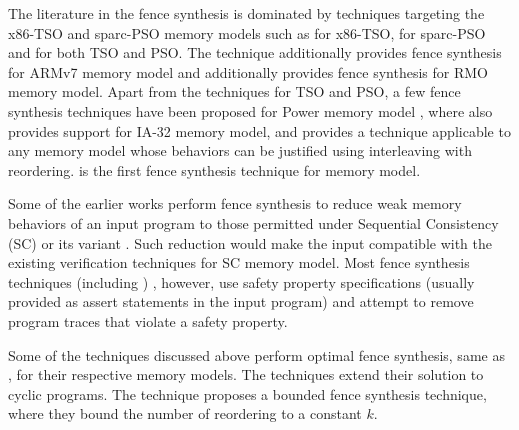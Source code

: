The literature in the  fence synthesis is dominated by 
techniques targeting the x86-TSO and sparc-PSO memory models
such as \cite{abdulla2012counter,alglave2010fences,alglave2014don,linden2011verification,abdulla2012automatic,abdulla2015best,bender2015declarative} 
for x86-TSO,
\cite{abdulla2015precise,linden2013verification} 
for sparc-PSO and \cite{liu2012dynamic,meshman2014synthesis,abdulla2013memorax,joshi2015property,kuperstein2012automatic}
for both TSO and PSO.
%
The technique \cite{bender2015declarative} additionally
provides fence synthesis for ARMv7 memory model and 
\cite{kuperstein2012automatic} additionally provides
fence synthesis for RMO memory model.
%
Apart from the techniques for TSO and PSO, a few 
fence synthesis techniques have been proposed for Power
memory model 
\cite{alglave2010fences,abdulla2015precise,fang2003automatic}, 
where \cite{fang2003automatic} also 
provides support for IA-32 memory model, and
\cite{joshi2015property} provides a technique applicable to
any memory model whose behaviors can be justified using
interleaving with reordering.
%
\ourtechnique is the first fence synthesis technique for 
\cc memory model.

Some of the earlier works  
\cite{alglave2010fences,abdulla2015precise,fang2003automatic} 
perform fence synthesis to reduce weak memory behaviors of an 
input program to those permitted under Sequential Consistency (SC)
or its variant \cite{abdulla2015best}. Such reduction would
make the input compatible with the existing verification 
techniques  for SC memory model.
%
Most fence synthesis techniques (including \ourtechnique)
\cite{meshman2014synthesis}\cite{abdulla2012counter}\cite{abdulla2013memorax}\cite{joshi2015property}\cite{abdulla2015precise}\cite{linden2011verification}\cite{kuperstein2012automatic}\cite{abdulla2012automatic}\cite{linden2013verification}, however, 
use safety property specifications (usually provided as assert
statements in the input program) and attempt to remove 
program traces that violate a safety property.

Some of the techniques discussed above
\cite{meshman2014synthesis}\cite{taheri2019polynomial}\cite{abdulla2012counter}\cite{abdulla2013memorax}\cite{joshi2015property}\cite{abdulla2015precise}\cite{kuperstein2012automatic}\cite{bender2015declarative} perform optimal fence synthesis, 
same as \ourtechnique, for their respective memory models.
%
The techniques \cite{linden2011verification}\cite{linden2013verification} 
extend their solution to cyclic programs.
%
The technique \cite{joshi2015property} proposes a bounded 
fence synthesis technique, where they bound the number of 
reordering to a constant $k$.